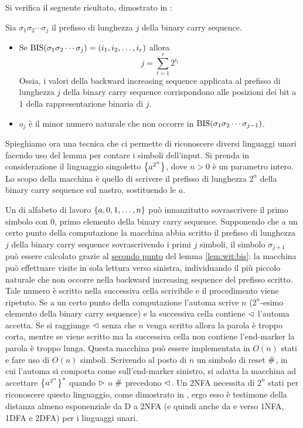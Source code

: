 Si verifica il seguente risultato, dimostrato in \cite{Pighizzini:19:limitedunary}:
\begin{lemma}\label{lem:wit:bis}
	Sia $\sigma_1\sigma_2\cdots\sigma_j$ il prefisso di lunghezza $j$ della binary carry sequence.
	\begin{itemize}
		\item \label{lem:wit:bis:1} Se $\mathrm{BIS}(\sigma_1\sigma_2\cdots\sigma_j)=(i_1,i_2,\dots,i_r)$ allora
		      \begin{equation*}
			      j=\sum_{t=1}^r 2^{i_t}
		      \end{equation*}
		      Ossia, i valori della backward increasing sequence applicata al prefisso di lunghezza $j$ della binary carry sequence corrispondono alle posizioni dei bit a $1$ della rappresentazione binaria di $j$.
		\item \label{lem:wit:bis:2} $o_j$ è il minor numero naturale che non occorre in $\mathrm{BIS}(\sigma_1\sigma_2\cdots\sigma_{j-1})$.
	\end{itemize}
\end{lemma}

Spieghiamo ora una tecnica che ci permette di riconoscere diversi linguaggi unari facendo uso del lemma per contare i simboli dell'input. Si prenda in considerazione il linguaggio singoletto $\left\{ a^{2^n} \right\}$, dove $n>0$ è un parametro intero. Lo scopo della macchina è quello di scrivere il prefisso di lunghezza $2^n$ della binary carry sequence sul nastro, sostituendo le $a$.

Un  di alfabeto di lavoro $\left\{ a,0,1,\dots,n \right\}$ può innanzitutto sovrascrivere il primo simbolo con $0$, primo elemento della binary carry sequence. Supponendo che a un certo punto della computazione la macchina abbia scritto il prefisso di lunghezza $j$ della binary carry sequence sovrascrivendo i primi $j$ simboli, il simbolo $\sigma_{j+1}$ può essere calcolato grazie al \hyperref[lem:wit:bis:2]{secondo punto} del lemma \ref{lem:wit:bis}: la macchina può effettuare visite in sola lettura verso sinistra, individuando il più piccolo naturale che non occorre nella backward increasing sequence del prefisso scritto. Tale numero è scritto nella successiva cella scrivibile e il procedimento viene ripetuto. Se a un certo punto della computazione l'automa scrive $n$ ($2^n$-esimo elemento della binary carry sequence) e la successiva cella contiene $\lhd$ l'automa accetta. Se si raggiunge $\lhd$ senza che $n$ venga scritto allora la parola è troppo corta, mentre se viene scritto ma la successiva cella non contiene l'end-marker la parola è troppo lunga. Questa macchina può essere implementata in $O(n)$ stati e fare uso di $O(n)$ simboli. Scrivendo al posto di $n$ un simbolo di reset $\#$, in cui l'automa si comporta come sull'end-marker sinistro, si adatta la macchina ad accettare $\left\{ a^{2^n} \right\}^*$ quando $\rhd$ o $\#$ precedono $\lhd$. Un 2NFA necessita di $2^n$ stati per riconoscere questo linguaggio, come dimostrato in \cite{Mereghetti:00:twoway}, ergo esso è testimone della distanza almeno esponenziale da D a 2NFA (e quindi anche da  e verso 1NFA, 1DFA e 2DFA) per i linguaggi unari.

